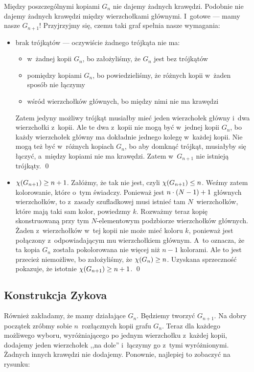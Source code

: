 Między poszczególnymi kopiami $G_n$ nie dajemy żadnych krawędzi. Podobnie nie dajemy żadnych krawędzi między wierzchołkami głównymi. I~gotowe --- mamy nasze $G_{n + 1}$! Przyjrzyjmy się, czemu taki graf spełnia nasze wymagania:
\begin{itemize}
	\item brak trójkątów --- oczywiście żadnego trójkąta nie ma:
	      \begin{itemize}
		      \item w~żadnej kopii $G_n$, bo założyliśmy, że $G_n$ jest bez trójkątów
		      \item pomiędzy kopiami $G_n$, bo powiedzieliśmy, że różnych kopii w~żaden sposób nie łączymy
		      \item wśród wierzchołków głównych, bo między nimi nie ma krawędzi
	      \end{itemize}
	      Zatem jedyny możliwy trójkąt musiałby mieć jeden wierzchołek główny i~dwa wierzchołki z~kopii. Ale te dwa z~kopii nie mogą być w~jednej kopii $G_n$, bo każdy wierzchołek główny ma dokładnie jednego kolegę w~każdej kopii. Nie mogą też być w~różnych kopiach $G_n$, bo aby domknąć trójkąt, musiałyby się łączyć, a~między kopiami nie ma krawędzi. Zatem w~$G_{n + 1}$ nie istnieją trójkąty.
	      \qed
	\item $\chi\pars{G_{n + 1}} \geq n + 1$. Załóżmy, że tak nie jest, czyli $\chi\pars{G_{n + 1}} \leq n$. Weźmy zatem kolorowanie, które o~tym świadczy. Ponieważ jest $n \cdot \left(N - 1\right) + 1$ głównych wierzchołków, to z~zasady szufladkowej musi istnieć tam $N$~wierzchołków, które mają taki sam kolor, powiedzmy $k$. Rozważmy teraz kopię skonstruowaną przy tym $N$-elementowym podzbiorze wierzchołków głównych. Żaden z~wierzchołków w~tej kopii nie może mieć koloru $k$, ponieważ jest połączony z~odpowiadającym mu wierzchołkiem głównym. A~to oznacza, że ta kopia $G_n$ została pokolorowana nie więcej niż $n - 1$ kolorami. Ale to jest przecież niemożliwe, bo założyliśmy, że $\chi\pars{G_n} \geq n$. Uzyskana sprzeczność pokazuje, że istotnie $\chi\pars{G_{n + 1}} \geq n + 1$.
	      \qed
\end{itemize}

\subsection{Konstrukcja Zykova}
Również zakładamy, że mamy działające $G_n$. Będziemy tworzyć $G_{n + 1}$. Na dobry początek zróbmy sobie $n$~rozłącznych kopii grafu $G_n$. Teraz dla każdego możliwego wyboru, wyróżniającego po jednym wierzchołku z~każdej kopii, dodajemy jeden wierzchołek ,,na dole'' i~łączymy go z~tymi wyróżnionymi. Żadnych innych krawędzi nie dodajemy. Ponownie, najlepiej to zobaczyć na rysunku:

